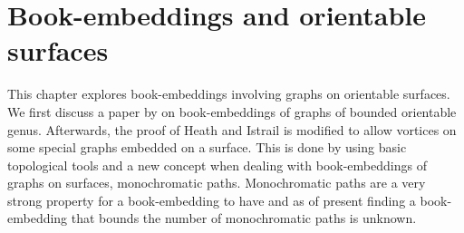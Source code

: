 \chapter{Book-embeddings and orientable surfaces}\label{chap:orientable}

This chapter explores book-embeddings involving graphs on orientable surfaces. We first discuss a paper by \textcite{heathPagenumberGenusGraphs1992} on book-embeddings of graphs of bounded orientable genus. Afterwards, the proof of Heath and Istrail is modified to allow vortices on some special graphs embedded on a surface. This is done by using basic topological tools and a new concept when dealing with book-embeddings of graphs on surfaces, monochromatic paths. Monochromatic paths are a very strong property for a book-embedding to have and as of present finding a book-embedding that bounds the number of monochromatic paths is unknown. 





%
